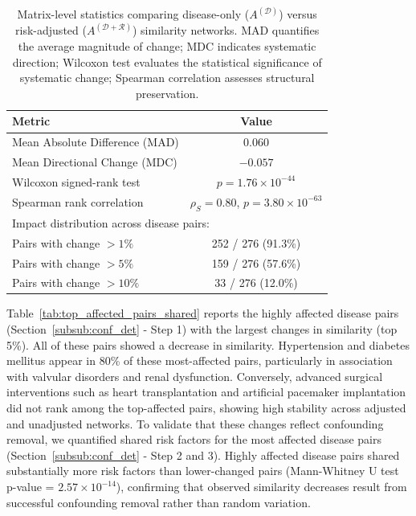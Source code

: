 \begin{table}[h]
\centering
\begin{tabular}{lc}
\hline
\textbf{Metric} & \textbf{Value} \\
\hline
Mean Absolute Difference (MAD) & 0.060 \\
Mean Directional Change (MDC) & $-0.057$ \\
Wilcoxon signed-rank test & $p = 1.76 \times 10^{-44}$ \\
Spearman rank correlation & $\rho_S = 0.80$, $p = 3.80 \times 10^{-63}$ \\
\hline
\multicolumn{2}{l}{Impact distribution across disease pairs:} \\
\text{ } Pairs with change $> 1\%$ & 252 / 276 (91.3\%) \\
\text{ } Pairs with change $> 5\%$ & 159 / 276 (57.6\%) \\
\text{ } Pairs with change $> 10\%$ & 33 / 276 (12.0\%) \\
\hline
\end{tabular}
\caption{Matrix-level statistics comparing disease-only ($A^{(\mathcal{D})}$) versus risk-adjusted ($A^{(\mathcal{D+R})}$) similarity networks. MAD quantifies the average magnitude of change; MDC indicates systematic direction; Wilcoxon test evaluates the statistical significance of systematic change; Spearman correlation assesses structural preservation.}
\label{tab:matrix_level_stats}
\end{table}
Table~\ref{tab:top_affected_pairs_shared} reports the highly affected disease pairs (Section~\ref{subsub:conf_det} - Step 1) with the largest changes in similarity (top 5\%). All of these pairs showed a decrease in similarity. Hypertension and diabetes mellitus appear in 80\% of these most-affected pairs, particularly in association with valvular disorders and renal dysfunction. Conversely, advanced surgical interventions such as heart transplantation and artificial pacemaker implantation did not rank among the top-affected pairs, showing high stability across adjusted and unadjusted networks. To validate that these changes reflect confounding removal, we quantified shared risk factors for the most affected disease pairs (Section~\ref{subsub:conf_det} - Step 2 and 3). Highly affected disease pairs shared substantially more risk factors than lower-changed pairs (Mann-Whitney U test p-value = $2.57 \times 10^{-14}$), confirming that observed similarity decreases result from successful confounding removal rather than random variation.

